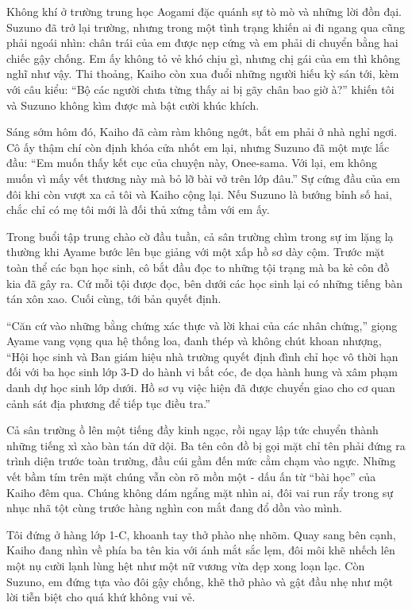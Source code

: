 \documentclass[../main.tex]{subfiles}
\begin{document}
Không khí ở trường trung học Aogami đặc quánh sự tò mò và những lời đồn đại. Suzuno đã trở lại trường, nhưng trong một tình trạng khiến ai đi ngang qua cũng phải ngoái nhìn: chân trái của em được nẹp cứng và em phải di chuyển bằng hai chiếc gậy chống. Em ấy không tỏ vẻ khó chịu gì, nhưng chị gái của em thì không nghĩ như vậy. Thi thoảng, Kaiho còn xua đuổi những người hiếu kỳ sán tới, kèm với câu kiểu: ``Bộ các người chưa từng thấy ai bị gãy chân bao giờ à?'' khiến tôi và Suzuno không kìm được mà bật cười khúc khích.

Sáng sớm hôm đó, Kaiho đã càm ràm không ngớt, bắt em phải ở nhà nghỉ ngơi. Cô ấy thậm chí còn định khóa cửa nhốt em lại, nhưng Suzuno đã một mực lắc đầu: ``Em muốn thấy kết cục của chuyện này, Onee-sama. Với lại, em không muốn vì mấy vết thương này mà bỏ lỡ bài vở trên lớp đâu.'' Sự cứng đầu của em đôi khi còn vượt xa cả tôi và Kaiho cộng lại. Nếu Suzuno là bướng bỉnh số hai, chắc chỉ có mẹ tôi mới là đối thủ xứng tầm với em ấy.

Trong buổi tập trung chào cờ đầu tuần, cả sân trường chìm trong sự im lặng lạ thường khi Ayame bước lên bục giảng với một xấp hồ sơ dày cộm. Trước mặt toàn thể các bạn học sinh, cô bắt đầu đọc to những tội trạng mà ba kẻ côn đồ kia đã gây ra. Cứ mỗi tội được đọc, bên dưới các học sinh lại có những tiếng bàn tán xôn xao. Cuối cùng, tới bản quyết định.

``Căn cứ vào những bằng chứng xác thực và lời khai của các nhân chứng,'' giọng Ayame vang vọng qua hệ thống loa, đanh thép và không chút khoan nhượng, ``Hội học sinh và Ban giám hiệu nhà trường quyết định đình chỉ học vô thời hạn đối với ba học sinh lớp 3-D do hành vi bắt cóc, đe dọa hành hung và xâm phạm danh dự học sinh lớp dưới. Hồ sơ vụ việc hiện đã được chuyển giao cho cơ quan cảnh sát địa phương để tiếp tục điều tra.''

Cả sân trường ồ lên một tiếng đầy kinh ngạc, rồi ngay lập tức chuyển thành những tiếng xì xào bàn tán dữ dội. Ba tên côn đồ bị gọi mặt chỉ tên phải đứng ra trình diện trước toàn trường, đầu cúi gầm đến mức cằm chạm vào ngực. Những vết bầm tím trên mặt chúng vẫn còn rõ mồn một - dấu ấn từ ``bài học'' của Kaiho đêm qua. Chúng không dám ngẩng mặt nhìn ai, đôi vai run rẩy trong sự nhục nhã tột cùng trước hàng nghìn con mắt đang đổ dồn vào mình.

Tôi đứng ở hàng lớp 1-C, khoanh tay thở phào nhẹ nhõm. Quay sang bên cạnh, Kaiho đang nhìn về phía ba tên kia với ánh mắt sắc lẹm, đôi môi khẽ nhếch lên một nụ cười lạnh lùng hệt như một nữ vương vừa dẹp xong loạn lạc. Còn Suzuno, em đứng tựa vào đôi gậy chống, khẽ thở phào và gật đầu nhẹ như một lời tiễn biệt cho quá khứ không vui vẻ.
\end{document}
